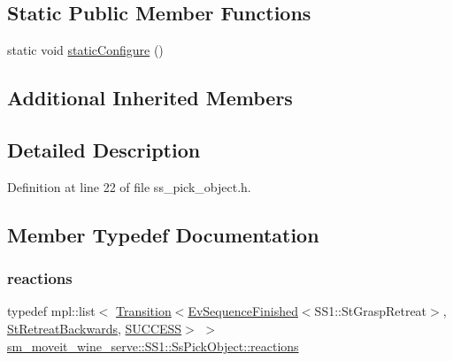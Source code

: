 \subsection*{Static Public Member Functions}
\begin{DoxyCompactItemize}
\item 
static void \hyperlink{structsm__moveit__wine__serve_1_1SS1_1_1SsPickObject_a25b19c030152b898ddcc068c1e49e4fa}{static\+Configure} ()
\end{DoxyCompactItemize}
\subsection*{Additional Inherited Members}


\subsection{Detailed Description}


Definition at line 22 of file ss\+\_\+pick\+\_\+object.\+h.



\subsection{Member Typedef Documentation}
\mbox{\label{structsm__moveit__wine__serve_1_1SS1_1_1SsPickObject_a72a26bf2abcbb1b0bac00e561ba1175c}} 
\subsubsection{\texorpdfstring{reactions}{reactions}}
{\footnotesize\ttfamily typedef mpl\+::list$<$ \hyperlink{classsmacc_1_1Transition}{Transition}$<$\hyperlink{structsmacc_1_1default__events_1_1EvSequenceFinished}{Ev\+Sequence\+Finished}$<$S\+S1\+::\+St\+Grasp\+Retreat$>$, \hyperlink{structsm__moveit__wine__serve_1_1StRetreatBackwards}{St\+Retreat\+Backwards}, \hyperlink{structsmacc_1_1default__transition__tags_1_1SUCCESS}{S\+U\+C\+C\+E\+SS}$>$ $>$ \hyperlink{structsm__moveit__wine__serve_1_1SS1_1_1SsPickObject_a72a26bf2abcbb1b0bac00e561ba1175c}{sm\+\_\+moveit\+\_\+wine\+\_\+serve\+::\+S\+S1\+::\+Ss\+Pick\+Object\+::reactions}}



